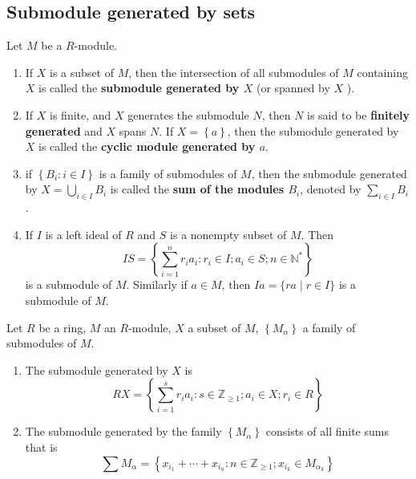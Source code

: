 \subsection{Submodule generated by sets}
\begin{definition}
    Let $M$ be a $R$-module. \begin{enumerate}
        \item
              If $X$ is a subset of $M$, then the intersection of all submodules of $M$ containing $X$ is called the \textbf{submodule generated by ${X}$} (or spanned by ${X}$ ).

        \item
              If $X$ is finite, and $X$ generates the submodule $N$, then $N$ is said to be \textbf{finitely generated} and $X$ spans $N$.
              If $X=\left\{a\right\}$, then the submodule generated by $X$ is called the \textbf{cyclic module generated by $a$}.

        \item if $\left\{B_i : i \in I\right\}$ is a family of submodules of $M$, then the submodule generated by $X=\bigcup_{i \in I} B_i$ is called the \textbf{sum of the modules $B_i$}, denoted by $\sum_{i \in I} B_i$.
        \item
              If $I$ is a left ideal of $R$ and $S$ is a nonempty subset of $M$. Then
              \begin{equation*}
                  I S=\left\{\sum_{i=1}^n r_i a_i : r_i \in I ; a_i \in S ; n \in \mathbb{N}^*\right\}
              \end{equation*}
              is a submodule of $M$.
              Similarly if $a \in M$, then $I a=\{r a \mid r \in I\}$ is a submodule of $M$.
    \end{enumerate}
\end{definition}

\begin{theorem}
    Let $R$ be a ring, $M$ an $R$-module, $X$ a subset of $  M$, $\left\{ M_\alpha\right\}$ a family of submodules of $M$.
    \begin{enumerate}
        \item
              The submodule generated by $X$ is
              \begin{equation*}
                  R X
                  =
                  \left\{\sum_{i=1}^s r_i a_i : s \in\mathbb{Z}_{\geq 1} ; a_i \in X ; r_i \in R\right\}
              \end{equation*}
        \item
              The submodule generated by the family $\left\{M_\alpha\right\}$ consists of all finite sums
              that is
              \begin{equation*}
                  \sum M_\alpha
                  =
                  \left\{x_{  i_1}+\cdots+  x_{i_n} :n \in \mathbb{Z}_{\geq 1} ; x_{i_k} \in M_{\alpha_k} \right\}
              \end{equation*}
    \end{enumerate}
\end{theorem}



